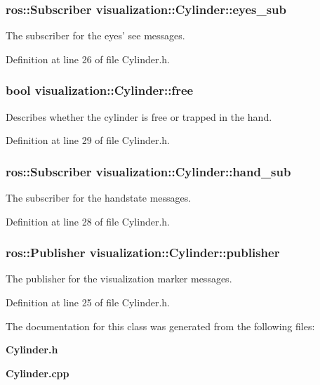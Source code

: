 \subsubsection[{eyes\-\_\-sub}]{\setlength{\rightskip}{0pt plus 5cm}ros\-::\-Subscriber visualization\-::\-Cylinder\-::eyes\-\_\-sub\hspace{0.3cm}{\ttfamily [protected]}}\label{classvisualization_1_1Cylinder_a6f0efd213097e8ae42c117c3550b0590}


The subscriber for the eyes' see messages. 



Definition at line 26 of file Cylinder.\-h.

\subsubsection[{free}]{\setlength{\rightskip}{0pt plus 5cm}bool visualization\-::\-Cylinder\-::free\hspace{0.3cm}{\ttfamily [protected]}}\label{classvisualization_1_1Cylinder_aff9f4e3ff407ec41a2f6a0f4b6c997ef}


Describes whether the cylinder is free or trapped in the hand. 



Definition at line 29 of file Cylinder.\-h.

\subsubsection[{hand\-\_\-sub}]{\setlength{\rightskip}{0pt plus 5cm}ros\-::\-Subscriber visualization\-::\-Cylinder\-::hand\-\_\-sub\hspace{0.3cm}{\ttfamily [protected]}}\label{classvisualization_1_1Cylinder_ac4f251376592822ed21b37277fdc08e1}


The subscriber for the handstate messages. 



Definition at line 28 of file Cylinder.\-h.

\subsubsection[{publisher}]{\setlength{\rightskip}{0pt plus 5cm}ros\-::\-Publisher visualization\-::\-Cylinder\-::publisher\hspace{0.3cm}{\ttfamily [protected]}}\label{classvisualization_1_1Cylinder_ad0dfcb66c8d7a111be28f710dfd77617}


The publisher for the visualization marker messages. 



Definition at line 25 of file Cylinder.\-h.



The documentation for this class was generated from the following files\-:\begin{DoxyCompactItemize}
\item 
{\bf Cylinder.\-h}\item 
{\bf Cylinder.\-cpp}\end{DoxyCompactItemize}
